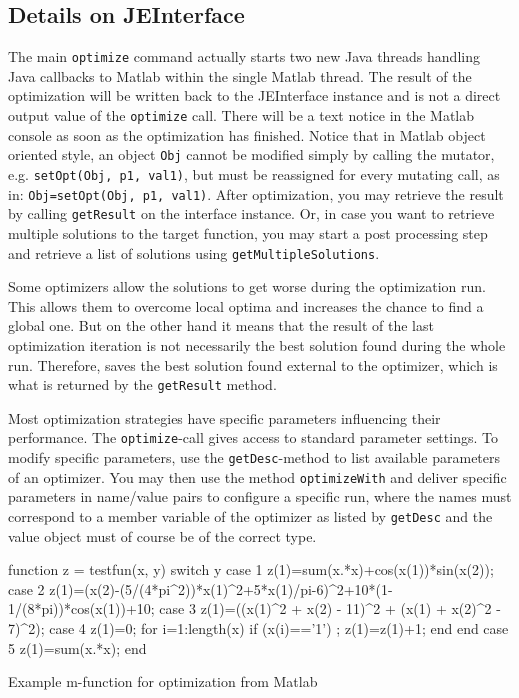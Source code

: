 \subsection{Details on JEInterface}

The main \texttt{optimize} command actually starts two new Java threads
handling Java callbacks to Matlab within the single Matlab thread.
The result of the optimization will be written back to the JEInterface
instance and is not a direct output value of the \texttt{optimize}
call. There will be a text notice in the Matlab console as soon as
the optimization has finished. Notice that in Matlab object oriented
style, an object \texttt{Obj} cannot be modified simply by calling
the mutator, e.g. \texttt{setOpt(Obj, p1, val1)}, but must be reassigned
for every mutating call, as in: \texttt{Obj=setOpt(Obj, p1, val1)}.
After optimization, you may retrieve the result by calling \texttt{getResult}
on the interface instance. Or, in case you want to retrieve multiple
solutions to the target function, you may start a post processing
step and retrieve a list of solutions using \texttt{getMultipleSolutions}.

Some optimizers allow the solutions to get worse during the optimization
run. This allows them to overcome local optima and increases the chance
to find a global one. But on the other hand it means that the result
of the last optimization iteration is not necessarily the best solution
found during the whole run. Therefore,  saves the best
solution found external to the optimizer, which is what is returned
by the \texttt{getResult} method. 

Most optimization strategies have specific parameters influencing
their performance. The \texttt{optimize}-call gives access to standard
parameter settings. To modify specific parameters, use the \texttt{getDesc}-method
to list available parameters of an optimizer. You may then use the
method \texttt{optimizeWith} and deliver specific parameters in name/value
pairs to configure a specific run, where the names must correspond
to a member variable of the optimizer as listed by \texttt{getDesc}
and the value object must of course be of the correct type.

\begin{algorithm}
\begin{mylstenv}
function z = testfun(x, y) 
switch y     
  case 1 %
    z(1)=sum(x.*x)+cos(x(1))*sin(x(2));     
  case 2 %
    z(1)=(x(2)-(5/(4*pi^2))*x(1)^2+5*x(1)/pi-6)^2+10*(1-1/(8*pi))*cos(x(1))+10;     
  case 3 %
    z(1)=((x(1)^2 + x(2) - 11)^2 + (x(1) + x(2)^2 - 7)^2);     
  case 4 %
    z(1)=0;
    for i=1:length(x)          
      if (x(i)=='1') ; z(1)=z(1)+1; end         
    end     
  case 5 %
    z(1)=sum(x.*x);
end
\end{mylstenv}

\caption{Example m-function for optimization from Matlab\label{alg:Example-m-function}}
\end{algorithm}


